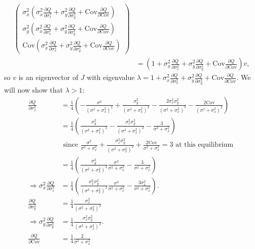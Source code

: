 \documentclass{article}
\newcommand{\Cov}{\text{Cov}}
\begin{document}
\begin{enumerate}
\begin{align*}
\left(\begin{array}{c}
\sigma_x^2\left(\sigma_x^2\frac{\partial Q}{\partial \sigma_x^2}+\sigma_y^2\frac{\partial Q}{\partial \sigma_y^2}+\Cov\frac{\partial Q}{\partial \Cov}\right) 
\\ \sigma_y^2\left(\sigma_x^2\frac{\partial Q}{\partial \sigma_x^2}+\sigma_y^2\frac{\partial Q}{\partial \sigma_y^2}+\Cov\frac{\partial Q}{\partial \Cov}\right)
\\ \Cov\left(\sigma_x^2\frac{\partial Q}{\partial \sigma_x^2}+\sigma_y^2\frac{\partial Q}{\partial \sigma_y^2}+\Cov\frac{\partial Q}{\partial \Cov}\right) \end{array}\right)
\\&=\left(1+\sigma_x^2\frac{\partial Q}{\partial \sigma_x^2}+\sigma_y^2\frac{\partial Q}{\partial \sigma_y^2}+\Cov\frac{\partial Q}{\partial \Cov}\right)v,
\end{align*}
so $v$ is an eigenvector of $J$ with eigenvalue $\lambda = 1+\sigma_x^2\frac{\partial Q}{\partial \sigma_x^2}+\sigma_y^2\frac{\partial Q}{\partial \sigma_y^2}+\Cov\frac{\partial Q}{\partial \Cov}$. We will now show that $\lambda>1$:
\begin{align*}
\frac{\partial Q}{\partial \sigma_x^2}&=\frac{1}{4}\left(-\frac{\sigma^2}{(\sigma^2+\sigma_x^2)^2}+\frac{\sigma_y^2}{(\sigma^2+\sigma_x^2)^2}-\frac{2\sigma_x^2\sigma_y^2}{(\sigma^2+\sigma_x^2)^3}-\frac{2\Cov}{(\sigma^2+\sigma_x^2)^2}\right)
\\&=\frac{1}{4}\left(\frac{\sigma_y^2}{(\sigma^2+\sigma_x^2)^2}-\frac{\sigma_x^2\sigma_y^2}{(\sigma^2+\sigma_x^2)^3}-\frac{3}{\sigma^2+\sigma_x^2}\right) 
\\&\text{ since $\frac{\sigma^2}{\sigma^2+\sigma_x^2}+\frac{\sigma_x^2\sigma_y^2}{(\sigma^2+\sigma_x^2)^2}+\frac{2\Cov}{\sigma^2+\sigma_x^2}=3$ at this equilibrium }
\\&=\frac{1}{4}\left(\frac{\sigma_y^2}{(\sigma^2+\sigma_x^2)^2}\frac{\sigma^2}{\sigma^2+\sigma_x^2}-\frac{3}{\sigma^2+\sigma_x^2}\right)
\\ \Rightarrow \sigma_x^2\frac{\partial Q}{\partial \sigma_x^2}&=\frac{1}{4}\left(\frac{\sigma_x^2\sigma_y^2}{(\sigma^2+\sigma_x^2)^2}\frac{\sigma^2}{\sigma^2+\sigma_x^2}-\frac{3\sigma_x^2}{\sigma^2+\sigma_x^2}\right).
\\\frac{\partial Q}{\partial \sigma_y^2}&=\frac{1}{4}\frac{\sigma_x^2}{(\sigma^2+\sigma_x^2)^2}
\\ \Rightarrow \sigma_y^2\frac{\partial Q}{\partial \sigma_y^2}&=\frac{1}{4}\frac{\sigma_x^2\sigma_y^2}{(\sigma^2+\sigma_x^2)^2}.
\\ \frac{\partial Q}{\partial \Cov}&=\frac{1}{4}\frac{2}{\sigma^2+\sigma_x^2}

\end{align*}
\end{enumerate}
\end{document}
